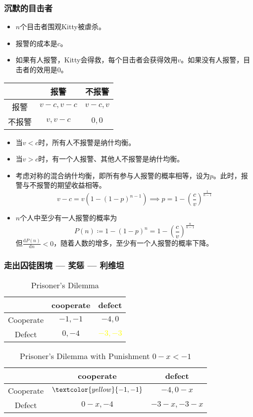 \documentclass[UTF8,11pt,colorlinks,compress,openany]{beamer}%
\begin{document}
\begin{frame}\frametitle{沉默的目击者}
	\setlength\abovedisplayskip{0pt}
	\setlength\belowdisplayskip{0pt}
\begin{itemize}
	\item $n$个目击者围观Kitty被虐杀。
	\item 报警的成本是$c$。
	\item 如果有人报警，Kitty会得救，每个目击者会获得效用$v$。如果没有人报警，目击者的效用是$0$。
\end{itemize}
\begin{table}
\begin{tabu}{c|c|c}
\hline
	& 报警 & 不报警 \\
\hline
报警 & $v-c,v-c$ & $v-c,v$ \\
不报警 & $v,v-c$ & $0,0$ \\
\hline
\end{tabu}
\end{table}
\begin{itemize}
	\item 当$v<c$时，所有人不报警是纳什均衡。
	\item 当$v>c$时，有一个人报警、其他人不报警是纳什均衡。
	\item 考虑对称的混合纳什均衡，即所有参与⼈报警的概率相等，设为$p$。此时，报警与不报警的期望收益相等。
	\[v-c=v(1-(1-p)^{n-1})\implies p=1-\left(\frac{c}{v}\right)^\frac{1}{n-1}\]
	\item $n$个人中至少有一人报警的概率为
	\[P(n)\coloneqq 1-(1-p)^n=1-\left(\frac{c}{v}\right)^\frac{n}{n-1}\]
	但$\frac{\mathrm{d}P(n)}{\mathrm{d}n}<0$，随着人数的增多，至少有一个人报警的概率下降。
\end{itemize}
\end{frame}

\begin{frame}\frametitle{走出囚徒困境 --- 奖惩 --- 利维坦}
\begin{table}
\begin{tabu}{c|cc}
\hline
 & cooperate & defect\\
\hline
Cooperate & $-1,-1$ & $-4,0$\\
Defect & $0,-4$ &\textcolor{yellow}{$-3,-3$}\\
\hline
\end{tabu}\caption{Prisoner's Dilemma}
\end{table}
\begin{table}
\begin{tabu}{c|cc}
\hline
 & cooperate & defect\\
\hline
Cooperate & $\textcolor{yellow}{-1,-1}$ & $-4,0-x$\\
Defect & $0-x,-4$ &$-3-x,-3-x$\\
\hline
\end{tabu}\caption{Prisoner's Dilemma with Punishment $0-x<-1$}
\end{table}	
\end{frame}
\end{document}
